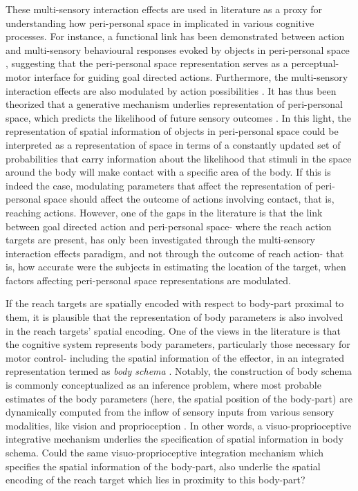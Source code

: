  These multi-sensory interaction effects are used in literature as a proxy for understanding how peri-personal space in implicated in various cognitive processes. For instance, a functional link has been demonstrated between action and multi-sensory behavioural responses evoked by objects in peri-personal space \cite{ladavas2008action, patane2019action, brozzoli2010action}, suggesting that the peri-personal space representation serves as a perceptual-motor interface for guiding goal directed actions. Furthermore, the multi-sensory interaction effects are also modulated by action possibilities \cite{lohmann2019hands, iriki1996coding, senna2019aim}. It has thus been theorized that a generative mechanism underlies representation of peri-personal space, which predicts the likelihood of future sensory outcomes \cite{lohmann2019hands, noel2018peri}. In this light, the representation of spatial information of objects in peri-personal space could be interpreted as a representation of space in terms of a constantly updated set of probabilities that carry information about the likelihood that stimuli in the space around the body will make contact with a specific area of the body. If this is indeed the case, modulating parameters that affect the representation of peri-personal space should affect the outcome of actions involving contact, that is, reaching actions. However, one of the gaps in the literature is that the link between goal directed action and peri-personal space- where the reach action targets are present, has only been investigated through the multi-sensory interaction effects paradigm, and not through the outcome of reach action- that is, how accurate were the subjects in estimating the location of the target, when factors affecting peri-personal space representations are modulated.

 If the reach targets are spatially encoded with respect to body-part proximal to them, it is plausible that the representation of body parameters is also involved in the reach targets' spatial encoding. One of the views in the literature is that the cognitive system represents body parameters, particularly those necessary for motor control- including the spatial information of the effector, in an integrated representation termed as \emph{body schema} \cite{ataria2021body}. Notably, the construction of body schema is commonly conceptualized as an inference problem, where most probable estimates of the body parameters (here, the spatial position of the body-part) are dynamically computed from the inflow of sensory inputs from various sensory modalities, like vision and proprioception \cite{van1999integration}. In other words, a visuo-proprioceptive integrative mechanism underlies the specification of spatial information in body schema. Could the same visuo-proprioceptive integration mechanism which specifies the spatial information of the body-part, also underlie the spatial encoding of the reach target which lies in proximity to this body-part?

